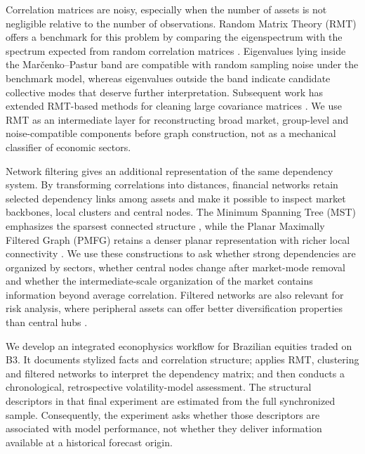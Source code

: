 Correlation matrices are noisy, especially when the number of assets is not negligible relative to the number of observations. Random Matrix Theory (RMT) offers a benchmark for this problem by comparing the eigenspectrum with the spectrum expected from random correlation matrices \cite{marcenko_1967_distribution,laloux_1999_noise,plerou_2002_random}. Eigenvalues lying inside the Mar\v{c}enko--Pastur band are compatible with random sampling noise under the benchmark model, whereas eigenvalues outside the band indicate candidate collective modes that deserve further interpretation. Subsequent work has extended RMT-based methods for cleaning large covariance matrices \cite{bun_2017_cleaning}. We use RMT as an intermediate layer for reconstructing broad market, group-level and noise-compatible components before graph construction, not as a mechanical classifier of economic sectors.

Network filtering gives an additional representation of the same dependency system. By transforming correlations into distances, financial networks retain selected dependency links among assets and make it possible to inspect market backbones, local clusters and central nodes. The Minimum Spanning Tree (MST) emphasizes the sparsest connected structure \cite{mantegna_1999_hierarchical}, while the Planar Maximally Filtered Graph (PMFG) retains a denser planar representation with richer local connectivity \cite{tumminello_2005_tool,tumminello_2010_correlation}. We use these constructions to ask whether strong dependencies are organized by sectors, whether central nodes change after market-mode removal and whether the intermediate-scale organization of the market contains information beyond average correlation. Filtered networks are also relevant for risk analysis, where peripheral assets can offer better diversification properties than central hubs \cite{pozzi_2013_spread,aste_2010_correlation}.

We develop an integrated econophysics workflow for Brazilian equities traded on B3. It documents stylized facts and correlation structure; applies RMT, clustering and filtered networks to interpret the dependency matrix; and then conducts a chronological, retrospective volatility-model assessment. The structural descriptors in that final experiment are estimated from the full synchronized sample. Consequently, the experiment asks whether those descriptors are associated with model performance, not whether they deliver information available at a historical forecast origin.


